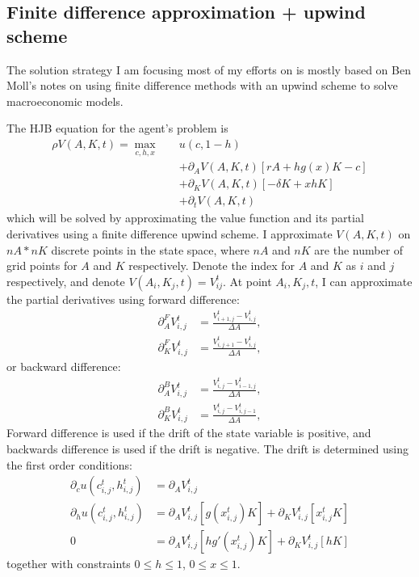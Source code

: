 \documentclass[12pt]{article}
\begin{document}
\subsection{Finite difference approximation + upwind scheme}
The solution strategy I am focusing most of my efforts on is mostly based on Ben Moll's notes on using finite difference methods with an upwind scheme to solve macroeconomic models.

The HJB equation for the agent's problem is
\begin{align*}
    \rho V(A, K, t) = \max_{c, h, x} \quad &u(c, 1-h) \\
    &+ \partial_A V(A, K, t) \left[rA + h g(x) K - c \right] \\
    &+ \partial_K V(A, K, t) \left[-\delta K + x h K \right] \\
    &+ \partial_t V(A, K, t)
\end{align*}
which will be solved by approximating the value function and its partial derivatives using a finite difference upwind scheme.
I approximate $V(A, K, t)$ on $nA*nK$ discrete points in the state space, where $nA$ and $nK$ are the number of grid points for $A$ and $K$ respectively.
Denote the index for $A$ and $K$ as $i$ and $j$ respectively, and denote $V(A_i, K_j, t) = V_{ij}^t$.
At point $A_i, K_j, t$, I can approximate the partial derivatives using forward difference:
\begin{align}
    \partial_A^F V_{i,j}^t &= \frac{V_{i+1, j}^t - V_{i, j}^t}{\Delta A}, \\
    \partial_K^F V_{i,j}^t &= \frac{V_{i, j+1}^t - V_{i, j}^t}{\Delta A},
\end{align}
or backward difference:
\begin{align}
    \partial_A^B V_{i,j}^t &= \frac{V_{i, j}^t - V_{i-1, j}^t}{\Delta A}, \\
    \partial_K^B V_{i,j}^t &= \frac{V_{i, j}^t - V_{i, j-1}^t}{\Delta A},
\end{align}
Forward difference is used if the drift of the state variable is positive, and backwards difference is used if the drift is negative.
The drift is determined using the first order conditions:
\begin{align}
    \partial_c u(c_{i,j}^t, h_{i,j}^t) &= \partial_A V_{i,j}^t \\
    \partial_h u(c_{i,j}^t, h_{i,j}^t) &= \partial_A V_{i,j}^t \left[ g(x_{i, j}^t) K \right] + \partial_K V_{i,j}^t \left[ x_{i, j}^t K \right] \\
    0 &= \partial_A V_{i,j}^t \left[ h g'(x_{i, j}^t) K \right] + \partial_K V_{i,j}^t \left[ h K \right]
\end{align}
together with constraints $0 \leq h \leq 1$, $0 \leq x \leq 1$.
\end{document}
